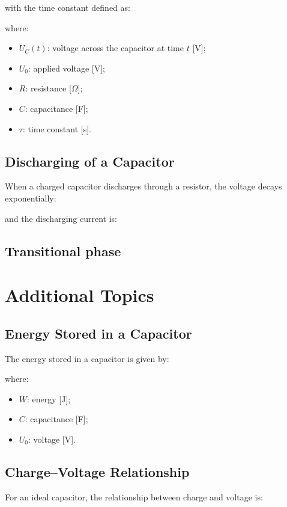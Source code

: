 \documentclass{article}
\begin{document}
with the time constant defined as:

where:
\begin{itemize}
    \item $U_C(t)$: voltage across the capacitor at time $t$ [V];
    \item $U_0$: applied voltage [V];
    \item $R$: resistance [$\Omega$];
    \item $C$: capacitance [F];
    \item $\tau$: time constant [s].
\end{itemize}

\subsection{Discharging of a Capacitor}
When a charged capacitor discharges through a resistor, the voltage decays exponentially:

and the discharging current is:

\newpage
\subsection{Transitional phase}

\section{Additional Topics}
\subsection{Energy Stored in a Capacitor}
The energy stored in a capacitor is given by:

where:
\begin{itemize}
    \item $W$: energy [J];
    \item $C$: capacitance [F];
    \item $U_0$: voltage [V].
\end{itemize}

\subsection{Charge--Voltage Relationship}
For an ideal capacitor, the relationship between charge and voltage is:
\end{document}
